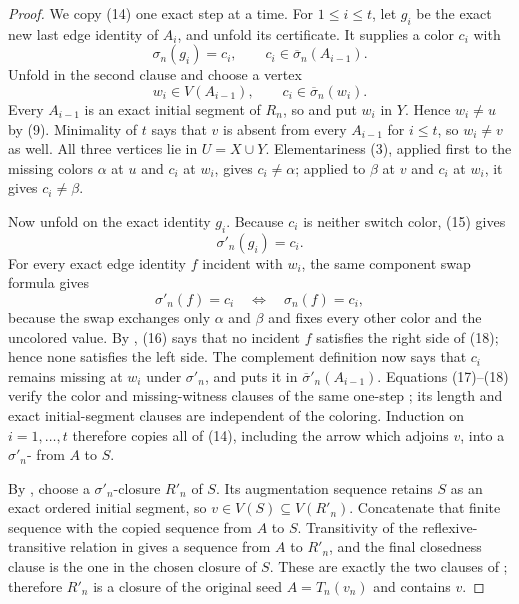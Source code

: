\begin{proof}
We copy (14) one exact step at a time.  For $1\le i\le t$, let $g_i$ be
the exact new last edge identity of $A_i$, and unfold its
 certificate.  It supplies a color $c_i$
with
\[
                 \sigma_n(g_i)=c_i,
       \qquad c_i\in\overline\sigma_n(A_{i-1}).               \tag{15}
\]
Unfold  in the second clause and choose a
vertex
\[
       w_i\in V(A_{i-1}),\qquad
       c_i\in\overline\sigma_n(w_i).                          \tag{16}
\]
Every $A_{i-1}$ is an exact initial segment of $R_n$, so
 and
 put $w_i$ in $Y$.  Hence $w_i\ne u$ by
(9).  Minimality of $t$ says that $v$ is absent from every
$A_{i-1}$ for $i\le t$, so $w_i\ne v$ as well.  All three vertices lie
in $U=X\cup Y$.  Elementariness (3), applied first to the missing colors
$\alpha$ at $u$ and $c_i$ at $w_i$, gives $c_i\ne\alpha$; applied to
$\beta$ at $v$ and $c_i$ at $w_i$, it gives $c_i\ne\beta$.

Now unfold  on the exact identity $g_i$.
Because $c_i$ is neither switch color, (15) gives
\[
                         \sigma'_n(g_i)=c_i.                 \tag{17}
\]
For every exact edge identity $f$ incident with $w_i$, the same component
swap formula gives
\[
       \sigma'_n(f)=c_i\quad\Longleftrightarrow\quad
       \sigma_n(f)=c_i,                                      \tag{18}
\]
because the swap exchanges only $\alpha$ and $\beta$ and fixes every
other color and the uncolored value.  By , (16)
says that no incident $f$ satisfies the right side of (18); hence none
satisfies the left side.  The complement definition
 now says that $c_i$ remains missing at $w_i$ under
$\sigma'_n$, and  puts it in
$\overline\sigma'_n(A_{i-1})$.  Equations (17)--(18) verify the color and
missing-witness clauses of the same one-step
; its length and exact initial-segment
clauses are independent of the coloring.  Induction on
$i=1,\ldots,t$ therefore copies all of (14), including the arrow which
adjoins $v$, into a
$\sigma'_n$- from $A$ to $S$.

By , choose a $\sigma'_n$-closure
$R'_n$ of $S$.  Its augmentation sequence retains $S$ as an exact ordered
initial segment, so $v\in V(S)\subseteq V(R'_n)$.  Concatenate that finite
sequence with the copied sequence from $A$ to $S$.  Transitivity of the
reflexive-transitive relation in
 gives a sequence from $A$ to
$R'_n$, and the final closedness clause is the one in the chosen closure
of $S$.  These are exactly the two clauses of
; therefore $R'_n$ is a closure of the original
seed $A=T_n(v_n)$ and contains $v$.


\end{proof}
